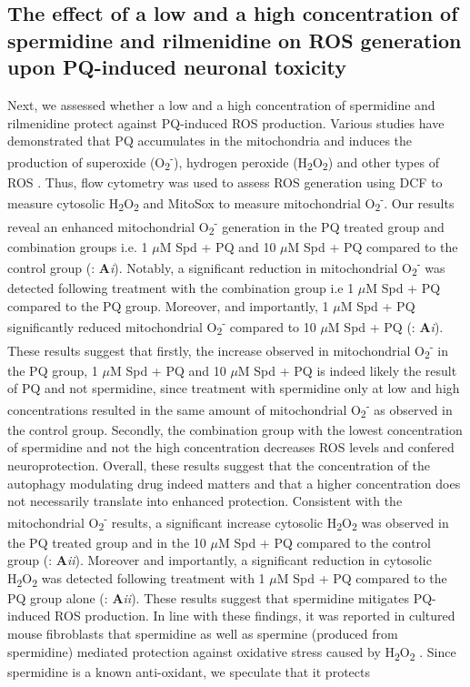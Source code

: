 \subsection{The effect of a low and a high concentration of spermidine and rilmenidine on ROS generation upon PQ-induced neuronal toxicity}
Next, we assessed whether a low and a high concentration of spermidine and rilmenidine protect against PQ-induced ROS production. Various studies have demonstrated that PQ accumulates in the mitochondria and induces the production of superoxide (O\textsubscript{2}\textsuperscript{-}), hydrogen peroxide (H\textsubscript{2}O\textsubscript{2}) and other types of ROS \citep{Cocheme2008,Jones2000,Yumino2002}. Thus, flow cytometry was used to assess ROS generation using DCF to measure cytosolic H\textsubscript{2}O\textsubscript{2} and MitoSox to measure mitochondrial O\textsubscript{2}\textsuperscript{-}. Our results reveal an enhanced mitochondrial O\textsubscript{2}\textsuperscript{-}  generation in the PQ treated group and combination groups i.e. 1 $\mu$M Spd + PQ and 10 $\mu$M Spd + PQ compared to the control group (: \textbf{A}\textit{i}). Notably, a significant reduction in mitochondrial O\textsubscript{2}\textsuperscript{-} was detected following treatment with the combination group i.e 1 $\mu$M Spd + PQ compared to the PQ group. Moreover, and importantly, 1 $\mu$M Spd + PQ significantly reduced mitochondrial O\textsubscript{2}\textsuperscript{-} compared to 10 $\mu$M Spd + PQ (: \textbf{A}\textit{i}). These results suggest that firstly, the increase observed in mitochondrial O\textsubscript{2}\textsuperscript{-} in the PQ group, 1 $\mu$M Spd + PQ and 10 $\mu$M Spd + PQ is indeed likely the result of PQ and not spermidine, since treatment with spermidine only at low and high concentrations resulted in the same amount of mitochondrial O\textsubscript{2}\textsuperscript{-} as observed in the control group. Secondly, the combination group with the lowest concentration of spermidine and not the high concentration decreases ROS levels and confered neuroprotection. Overall, these results suggest that the concentration of the autophagy modulating drug indeed matters and that a higher concentration does not necessarily translate into enhanced protection. Consistent with the mitochondrial O\textsubscript{2}\textsuperscript{-} results, a significant increase cytosolic H\textsubscript{2}O\textsubscript{2} was observed in the PQ treated group and in the 10 $\mu$M Spd + PQ compared to the control group (: \textbf{A}\textit{ii}). Moreover and importantly, a significant reduction in cytosolic H\textsubscript{2}O\textsubscript{2} was detected following treatment with 1 $\mu$M Spd + PQ compared to the PQ group alone (: \textbf{A}\textit{ii}). These results suggest that spermidine mitigates PQ-induced ROS production. In line with these findings, it was reported in cultured mouse fibroblasts that spermidine as well as spermine (produced from spermidine) mediated protection against oxidative stress caused by H\textsubscript{2}O\textsubscript{2} \citep{Rider2007}. Since spermidine is a known anti-oxidant, we speculate that it protects 
